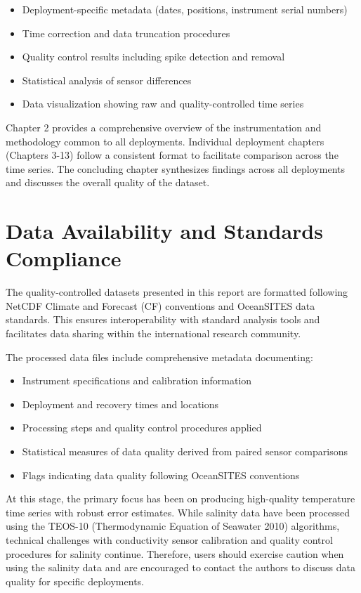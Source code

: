 \begin{itemize}
    \item Deployment-specific metadata (dates, positions, instrument serial numbers)
    \item Time correction and data truncation procedures
    \item Quality control results including spike detection and removal
    \item Statistical analysis of sensor differences
    \item Data visualization showing raw and quality-controlled time series
\end{itemize}

Chapter 2 provides a comprehensive overview of the instrumentation and methodology common to all deployments. Individual deployment chapters (Chapters 3-13) follow a consistent format to facilitate comparison across the time series. The concluding chapter synthesizes findings across all deployments and discusses the overall quality of the dataset.

\section{Data Availability and Standards Compliance}

The quality-controlled datasets presented in this report are formatted following NetCDF Climate and Forecast (CF) conventions and OceanSITES data standards. This ensures interoperability with standard analysis tools and facilitates data sharing within the international research community.

The processed data files include comprehensive metadata documenting:
\begin{itemize}
    \item Instrument specifications and calibration information
    \item Deployment and recovery times and locations
    \item Processing steps and quality control procedures applied
    \item Statistical measures of data quality derived from paired sensor comparisons
    \item Flags indicating data quality following OceanSITES conventions
\end{itemize}

At this stage, the primary focus has been on producing high-quality temperature time series with robust error estimates. While salinity data have been processed using the TEOS-10 (Thermodynamic Equation of Seawater 2010) algorithms, technical challenges with conductivity sensor calibration and quality control procedures for salinity continue. Therefore, users should exercise caution when using the salinity data and are encouraged to contact the authors to discuss data quality for specific deployments.

